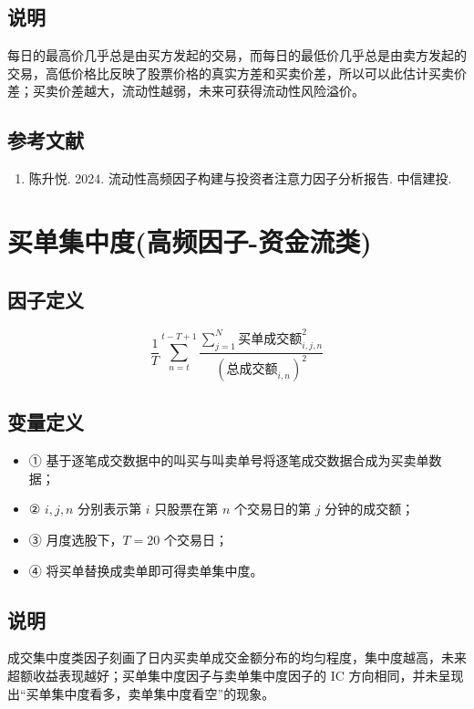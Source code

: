 \documentclass{article}
\begin{document}
\subsection{说明}
每日的最高价几乎总是由买方发起的交易，而每日的最低价几乎总是由卖方发起的交易，高低价格比反映了股票价格的真实方差和买卖价差，所以可以此估计买卖价差；买卖价差越大，流动性越弱，未来可获得流动性风险溢价。

\subsection{参考文献}
\begin{enumerate}
    \item 陈升悦. 2024. 流动性高频因子构建与投资者注意力因子分析报告. 中信建投.
\end{enumerate}

\section{买单集中度(高频因子-资金流类)}

\subsection{因子定义}
\begin{equation}
    \frac{1}{T} \sum_{n=t}^{t-T+1} \frac{\sum_{j=1}^{N} \text{买单成交额}_{i,j,n}^2}{(\text{总成交额}_{i,n})^2}
\end{equation}

\subsection{变量定义}
\begin{itemize}
    \item ① 基于逐笔成交数据中的叫买与叫卖单号将逐笔成交数据合成为买卖单数据；
    \item ② \( i, j, n \) 分别表示第 \( i \) 只股票在第 \( n \) 个交易日的第 \( j \) 分钟的成交额；
    \item ③ 月度选股下，\( T=20 \) 个交易日；
    \item ④ 将买单替换成卖单即可得卖单集中度。
\end{itemize}

\subsection{说明}
成交集中度类因子刻画了日内买卖单成交金额分布的均匀程度，集中度越高，未来超额收益表现越好；买单集中度因子与卖单集中度因子的 IC 方向相同，并未呈现出“买单集中度看多，卖单集中度看空”的现象。
\end{document}
